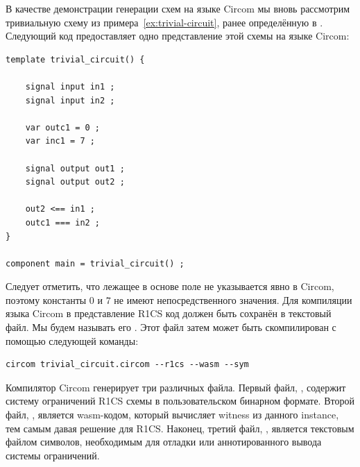\begin{example}
\label{ex:trivial-circuit-circom}
В качестве демонстрации генерации схем на языке Circom мы вновь рассмотрим тривиальную схему из примера~\ref{ex:trivial-circuit}, ранее определённую в . Следующий код предоставляет одно представление этой схемы на языке Circom:

\begin{lstlisting}
template trivial_circuit() {

    signal input in1 ;
    signal input in2 ;

    var outc1 = 0 ;
    var inc1 = 7 ;
    
    signal output out1 ;
    signal output out2 ;

    out2 <== in1 ;
    outc1 === in2 ;
}

component main = trivial_circuit() ;
\end{lstlisting}

Следует отметить, что лежащее в основе поле не указывается явно в Circom, поэтому константы $0$ и $7$ не имеют непосредственного значения. Для компиляции языка Circom в представление R1CS код должен быть сохранён в текстовый файл. Мы будем называть его . Этот файл затем может быть скомпилирован с помощью следующей команды:
\begin{lstlisting}
circom trivial_circuit.circom --r1cs --wasm --sym
\end{lstlisting}

Компилятор Circom генерирует три различных файла. Первый файл, , содержит систему ограничений R1CS схемы в пользовательском бинарном формате. Второй файл, , является wasm-кодом, который вычисляет witness из данного instance, тем самым давая решение для R1CS. Наконец, третий файл, , является текстовым файлом символов, необходимым для отладки или аннотированного вывода системы ограничений.
\end{example}

